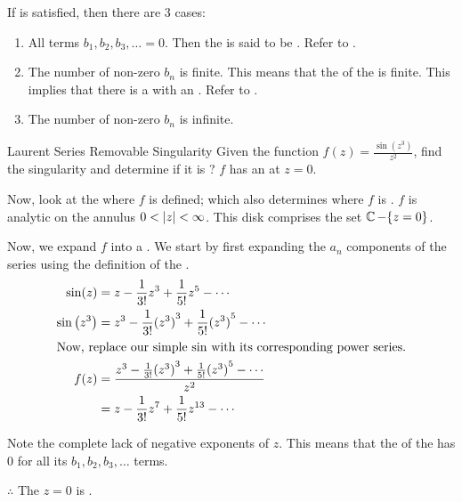 If  is satisfied, then there are 3 cases:
\begin{enumerate}[noitemsep]
\item All terms $b_{1}, b_{2}, b_{3}, \ldots = 0$.
  Then the  is said to be .
  Refer to .
\item The number of non-zero $b_{n}$ is finite.
  This means that the  of the  is finite.
  This implies that there is a  with an .
  Refer to .
\item The number of non-zero $b_{n}$ is infinite.
\end{enumerate}

\begin{example}{Laurent Series Removable Singularity}
  Given the function $f(z) = \frac{\sin \left( z^{3} \right)}{z^{2}}$, find the singularity and determine if it is ?
  \tcblower{}
  $f$ has an   at $z=0$.

  Now, look at the  where $f$ is defined; which also determines where $f$ is .
  $f$ is analytic on the annulus $0 < \left\lvert z \right\rvert < \infty$.
  This disk comprises the set $\operatorname{\mathbb{C}} - \lbrace z=0 \rbrace$.

  Now, we expand $f$ into a .
  We start by first expanding the $a_{n}$ components of the series using the definition of the .
  \begin{align*}
    \sin(z) &= z - \frac{1}{3!} z^{3} + \frac{1}{5!} z^{5} - \cdots \\
    \sin \left( z^{3}\right) &= z^{3} - \frac{1}{3!} {(z^{3})}^{3} + \frac{1}{5!} {(z^{3})}^{5} - \cdots \\
    \intertext{Now, replace our simple $\sin$ with its corresponding power series.}
    f(z) &= \frac{z^{3} - \frac{1}{3!} {(z^{3})}^{3} + \frac{1}{5!} {(z^{3})}^{5} - \cdots}{z^{2}} \\
    &= z - \frac{1}{3!} z^{7} + \frac{1}{5!} z^{13} - \cdots
  \end{align*}

  Note the complete lack of negative exponents of $z$.
  This means that the  of the  has $0$ for all its $b_{1}, b_{2}, b_{3}, \ldots$ terms.

  $\therefore$ The  $z=0$ is .
\end{example}

